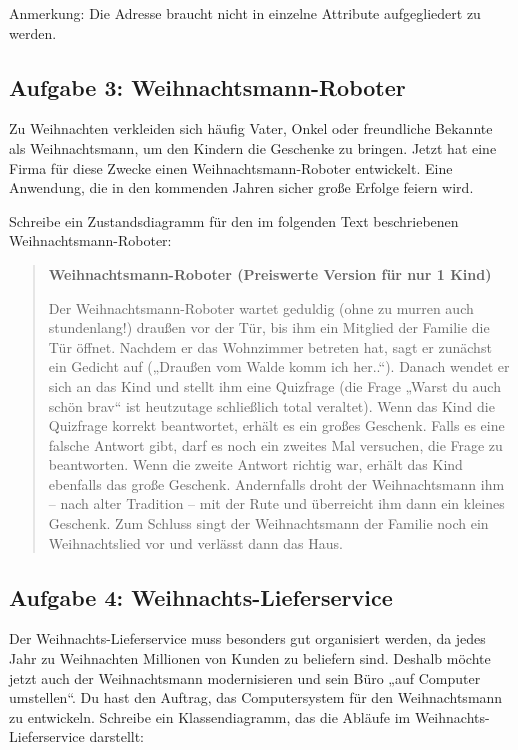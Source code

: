 Anmerkung: Die Adresse braucht nicht in einzelne Attribute aufgegliedert zu
werden.


\subsection{Aufgabe 3: Weihnachtsmann-Roboter}

Zu Weihnachten verkleiden sich häufig Vater, Onkel oder freundliche Bekannte als
Weihnachtsmann, um den Kindern die Geschenke zu bringen. Jetzt hat eine Firma
für diese Zwecke einen Weihnachtsmann-Roboter entwickelt. Eine Anwendung, die
in den kommenden Jahren sicher große Erfolge feiern wird.

Schreibe ein Zustandsdiagramm für den im folgenden Text beschriebenen
Weihnachtsmann-Roboter:

\begin{quotation}
\noindent \textbf{Weihnachtsmann-Roboter (Preiswerte Version für nur 1 Kind)}

\noindent Der Weihnachtsmann-Roboter wartet geduldig (ohne zu murren auch
stundenlang!) draußen vor der Tür, bis ihm ein Mitglied der Familie die Tür
öffnet. Nachdem er das Wohnzimmer betreten hat, sagt er zunächst ein Gedicht
auf („Draußen vom Walde komm ich her..“). Danach wendet er sich an das Kind und
stellt ihm eine Quizfrage (die Frage „Warst du auch schön brav“ ist heutzutage
schließlich total veraltet). Wenn das Kind die Quizfrage korrekt beantwortet,
erhält es ein großes Geschenk. Falls es eine falsche Antwort gibt, darf es noch
ein zweites Mal versuchen, die Frage zu beantworten. Wenn die zweite Antwort
richtig war, erhält das Kind ebenfalls das große Geschenk. Andernfalls droht der
Weihnachtsmann ihm – nach alter Tradition – mit der Rute und überreicht ihm
dann ein kleines Geschenk. Zum Schluss singt der Weihnachtsmann der Familie
noch ein Weihnachtslied vor und verlässt dann das Haus.
\end{quotation}


\subsection{Aufgabe 4: Weihnachts-Lieferservice}

Der Weihnachts-Lieferservice muss besonders gut organisiert werden, da jedes
Jahr zu Weihnachten Millionen von Kunden zu beliefern sind. Deshalb möchte
jetzt auch der Weihnachtsmann modernisieren und sein Büro „auf Computer
umstellen“. Du hast den Auftrag, das Computersystem für den Weihnachtsmann zu
entwickeln. Schreibe ein Klassendiagramm, das die Abläufe im
Weihnachts-Lieferservice darstellt:

